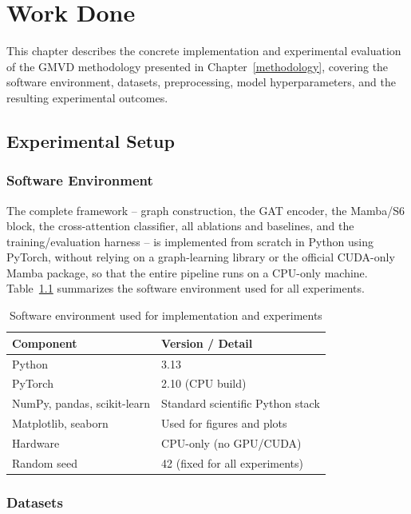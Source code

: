\documentclass[12pt, a4paper, openright, twoside]{report}
\begin{document}
\chapter{Work Done}
\label{workdone}
This chapter describes the concrete implementation and experimental evaluation of the GMVD methodology presented in Chapter~\ref{methodology}, covering the software environment, datasets, preprocessing, model hyperparameters, and the resulting experimental outcomes.
\section{Experimental Setup}

\subsection{Software Environment}

The complete framework -- graph construction, the GAT encoder, the Mamba/S6 block, the cross-attention classifier, all ablations and baselines, and the training/evaluation harness -- is implemented from scratch in Python using PyTorch, without relying on a graph-learning library or the official CUDA-only Mamba package, so that the entire pipeline runs on a CPU-only machine. Table~\ref{tab:software_env} summarizes the software environment used for all experiments.

\begin{table}[htbp]
\centering
\caption{Software environment used for implementation and experiments}
\label{tab:software_env}
\begin{tabular}{|l|l|}
\hline
\textbf{Component} & \textbf{Version / Detail} \\ \hline
Python & 3.13 \\ \hline
PyTorch & 2.10 (CPU build) \\ \hline
NumPy, pandas, scikit-learn & Standard scientific Python stack \\ \hline
Matplotlib, seaborn & Used for figures and plots \\ \hline
Hardware & CPU-only (no GPU/CUDA) \\ \hline
Random seed & 42 (fixed for all experiments) \\ \hline
\end{tabular}
\end{table}

\subsection{Datasets}
\end{document}

